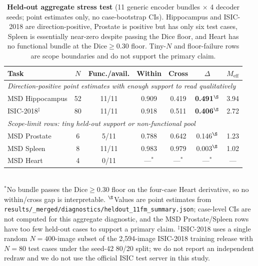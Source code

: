 \begin{table}[!htbp]
  \caption{\textbf{Held-out aggregate stress test} (11 generic encoder bundles $\times$ 4 decoder seeds; point estimates only, no case-bootstrap CIs). Hippocampus and ISIC-2018 are direction-positive, Prostate is positive but has only six test cases, Spleen is essentially near-zero despite passing the Dice floor, and Heart has no functional bundle at the Dice${\geq}0.30$ floor. Tiny-$N$ and floor-failure rows are scope boundaries and do not support the primary claim.}
  \label{tab:heldout}
  \centering\scriptsize
  \setlength{\tabcolsep}{3pt}
  \begin{tabular*}{\linewidth}{@{\extracolsep{\fill}}lcccccc}
    \toprule
    Task & $N$ & Func./avail. & Within & Cross & $\Delta$ & $M_{\mathrm{eff}}$ \\
    \midrule
    \multicolumn{7}{l}{\emph{Direction-positive point estimates with enough support to read qualitatively}} \\
    MSD Hippocampus   & 52  & 11/11 & 0.909 & 0.419 & \textbf{0.491}$^{\S}$ & 3.94 \\
    ISIC-2018$^{\ddagger}$ & 80 & 11/11 & 0.918 & 0.511 & \textbf{0.406}$^{\S}$ & 2.72 \\
    \midrule
    \multicolumn{7}{l}{\emph{Scope-limit rows: tiny held-out support or non-functional pool}} \\
    MSD Prostate & 6 & 5/11 & 0.788 & 0.642 & 0.146$^{\S}$ & 1.23 \\
    MSD Spleen   & 8 & 11/11 & 0.983 & 0.979 & 0.003$^{\S}$ & 1.02 \\
    MSD Heart    & 4 & 0/11 & ---$^{*}$ & ---$^{*}$ & ---$^{*}$ & --- \\
    \bottomrule
  \end{tabular*}
  \\[2pt]
  {\footnotesize $^{*}$No bundle passes the Dice${\geq}0.30$ floor on the four-case Heart derivative, so no within/cross gap is interpretable. $^{\S}$Values are point estimates from \texttt{results/\_merged/diagnostics/heldout\_11fm\_summary.json}; case-level CIs are not computed for this aggregate diagnostic, and the MSD Prostate/Spleen rows have too few held-out cases to support a primary claim. $^{\ddagger}$ISIC-2018 uses a single random $N{=}400$-image subset of the 2{,}594-image ISIC-2018 training release with $N{=}80$ test cases under the seed-42 80/20 split; we do not report an independent redraw and we do not use the official ISIC test server in this study.}
\end{table}

